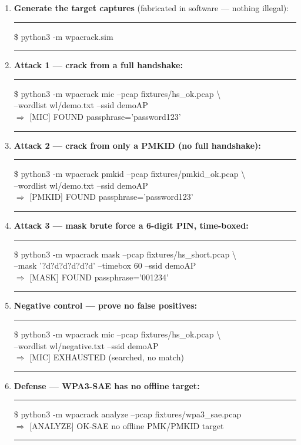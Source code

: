 \documentclass[11pt,a4paper]{article}
\newenvironment{cli}
  {\par\noindent\begin{minipage}{\textwidth}\small\ttfamily
   \setlength{\parindent}{0pt}\color{black}
   \vspace{2pt}\hrule\vspace{4pt}}
  {\vspace{4pt}\hrule\vspace{2pt}\end{minipage}\par\vspace{6pt}}
\begin{document}
\begin{enumerate}
\item \textbf{Generate the target captures} (fabricated in software --- nothing illegal):
\begin{cli}
\$ python3 -m wpacrack.sim
\end{cli}

\item \textbf{Attack 1 --- crack from a full handshake:}
\begin{cli}
\$ python3 -m wpacrack mic --pcap fixtures/hs\_ok.pcap \textbackslash\\
\hphantom{xx}--wordlist wl/demo.txt --ssid demoAP\\
$\Rightarrow$ [MIC] \textcolor{good}{FOUND} passphrase='password123'
\end{cli}

\item \textbf{Attack 2 --- crack from only a PMKID (no full handshake):}
\begin{cli}
\$ python3 -m wpacrack pmkid --pcap fixtures/pmkid\_ok.pcap \textbackslash\\
\hphantom{xx}--wordlist wl/demo.txt --ssid demoAP\\
$\Rightarrow$ [PMKID] \textcolor{good}{FOUND} passphrase='password123'
\end{cli}

\item \textbf{Attack 3 --- mask brute force a 6-digit PIN, time-boxed:}
\begin{cli}
\$ python3 -m wpacrack mask --pcap fixtures/hs\_short.pcap \textbackslash\\
\hphantom{xx}--mask '?d?d?d?d?d?d' --timebox 60 --ssid demoAP\\
$\Rightarrow$ [MASK] \textcolor{good}{FOUND} passphrase='001234'
\end{cli}

\item \textbf{Negative control --- prove no false positives:}
\begin{cli}
\$ python3 -m wpacrack mic --pcap fixtures/hs\_ok.pcap \textbackslash\\
\hphantom{xx}--wordlist wl/negative.txt --ssid demoAP\\
$\Rightarrow$ [MIC] \textcolor{warn}{EXHAUSTED} (searched, no match)
\end{cli}

\item \textbf{Defense --- WPA3-SAE has no offline target:}
\begin{cli}
\$ python3 -m wpacrack analyze --pcap fixtures/wpa3\_sae.pcap\\
$\Rightarrow$ [ANALYZE] \textcolor{good}{OK-SAE} no offline PMK/PMKID target
\end{cli}


\end{enumerate}
\end{document}
